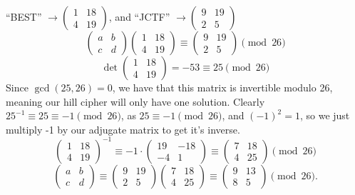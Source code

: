 \documentclass[12pt]{article}
\begin{document}
\begin{enumerate}
    ``BEST'' \(\to \begin{pmatrix} 1 & 18 \\ 4 & 19 \end{pmatrix}\), and ``JCTF'' \(\to \begin{pmatrix} 9 & 19 \\ 2 & 5 \end{pmatrix}\)
    \[\begin{pmatrix} a & b \\ c & d \end{pmatrix}\begin{pmatrix} 1 & 18 \\ 4 & 19 \end{pmatrix} \equiv  \begin{pmatrix} 9 & 19 \\ 2 & 5 \end{pmatrix} \pmod{26}\]
    \[\det \begin{pmatrix} 1 & 18 \\ 4 & 19 \end{pmatrix} = -53 \equiv 25 \pmod{26}\]
    Since \(\gcd(25,26) = 0\), we have that this matrix is invertible modulo 26, meaning our hill cipher will only have one solution.  Clearly \(25^{-1} \equiv 25 \equiv -1 \pmod{26}\), as \(25 \equiv -1 \pmod{26}\), and \((-1)^2 = 1\), so we just multiply -1 by our adjugate matrix to get it's inverse.
    \[\begin{pmatrix} 1 & 18 \\ 4 & 19 \end{pmatrix}^{-1} \equiv -1 \cdot \begin{pmatrix} 19 & -18 \\ -4 & 1 \end{pmatrix} \equiv \begin{pmatrix} 7 & 18 \\ 4 & 25 \end{pmatrix} \pmod{26}\]
    \[\begin{pmatrix} a & b \\ c & d \end{pmatrix} \equiv \begin{pmatrix} 9 & 19 \\ 2 & 5 \end{pmatrix}\begin{pmatrix} 7 & 18 \\ 4 & 25 \end{pmatrix} \equiv \begin{pmatrix} 9 & 13 \\ 8 & 5 \end{pmatrix} \pmod{26}.\]


\end{enumerate}
\end{document}
